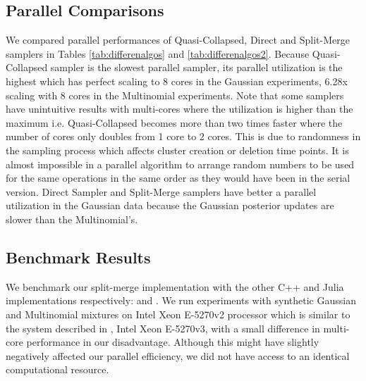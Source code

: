 \documentclass[12pt, a4paper]{article}
\begin{document}
\subsection{Parallel Comparisons}
We compared parallel performances of Quasi-Collapsed, Direct and Split-Merge samplers in Tables \ref{tab:differenalgos} and \ref{tab:differenalgos2}. Because Quasi-Collapsed sampler is the slowest parallel sampler, its parallel utilization is the highest which has perfect scaling to 8 cores in the Gaussian experiments, 6.28x scaling with 8 cores in the Multinomial experiments. Note that some samplers have unintuitive results with multi-cores where the utilization is higher than the maximum i.e. Quasi-Collapsed becomes more than two times faster where the number of cores only doubles from 1 core to 2 cores. This is due to randomness in the sampling process which affects cluster creation or deletion time points. It is almost impossible in a parallel algorithm to arrange random numbers to be used for the same operations in the same order as they would have been in the serial version. Direct Sampler and Split-Merge samplers have better a parallel utilization in the Gaussian data because the Gaussian posterior updates are slower than the Multinomial's. 





\subsection{Benchmark Results}

We benchmark our split-merge implementation with the other C++ and Julia implementations respectively: \cite{yu2016parallel} and \cite{Chang2013dpmm}. We run experiments with synthetic Gaussian and Multinomial mixtures on Intel Xeon E-5270v2 processor which is similar to the system described in \cite{yu2016parallel}, Intel Xeon E-5270v3, with a small difference in multi-core performance in our disadvantage. Although this might have slightly negatively affected our parallel efficiency, we did not have access to an identical computational resource. 
\end{document}
